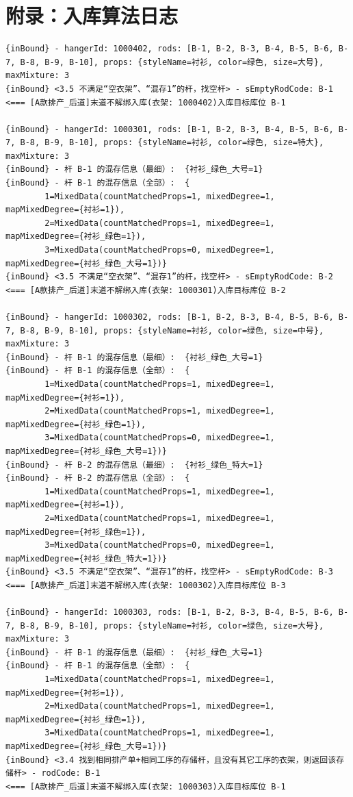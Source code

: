 \section{附录：入库算法日志}\label{sec:inbound-log}
{\scriptsize
\begin{verbatim}
{inBound} - hangerId: 1000402, rods: [B-1, B-2, B-3, B-4, B-5, B-6, B-7, B-8, B-9, B-10], props: {styleName=衬衫, color=绿色, size=大号}, maxMixture: 3
{inBound} <3.5 不满足“空衣架”、“混存1”的杆，找空杆> - sEmptyRodCode: B-1
<=== [A款排产_后道]末道不解绑入库(衣架: 1000402)入库目标库位 B-1

{inBound} - hangerId: 1000301, rods: [B-1, B-2, B-3, B-4, B-5, B-6, B-7, B-8, B-9, B-10], props: {styleName=衬衫, color=绿色, size=特大}, maxMixture: 3
{inBound} - 杆 B-1 的混存信息（最细）:  {衬衫_绿色_大号=1}
{inBound} - 杆 B-1 的混存信息（全部）:  {
		1=MixedData(countMatchedProps=1, mixedDegree=1, mapMixedDegree={衬衫=1}), 
		2=MixedData(countMatchedProps=1, mixedDegree=1, mapMixedDegree={衬衫_绿色=1}), 
		3=MixedData(countMatchedProps=0, mixedDegree=1, mapMixedDegree={衬衫_绿色_大号=1})}
{inBound} <3.5 不满足“空衣架”、“混存1”的杆，找空杆> - sEmptyRodCode: B-2
<=== [A款排产_后道]末道不解绑入库(衣架: 1000301)入库目标库位 B-2

{inBound} - hangerId: 1000302, rods: [B-1, B-2, B-3, B-4, B-5, B-6, B-7, B-8, B-9, B-10], props: {styleName=衬衫, color=绿色, size=中号}, maxMixture: 3
{inBound} - 杆 B-1 的混存信息（最细）:  {衬衫_绿色_大号=1}
{inBound} - 杆 B-1 的混存信息（全部）:  {
		1=MixedData(countMatchedProps=1, mixedDegree=1, mapMixedDegree={衬衫=1}),
		2=MixedData(countMatchedProps=1, mixedDegree=1, mapMixedDegree={衬衫_绿色=1}), 
		3=MixedData(countMatchedProps=0, mixedDegree=1, mapMixedDegree={衬衫_绿色_大号=1})}
{inBound} - 杆 B-2 的混存信息（最细）:  {衬衫_绿色_特大=1}
{inBound} - 杆 B-2 的混存信息（全部）:  {
		1=MixedData(countMatchedProps=1, mixedDegree=1, mapMixedDegree={衬衫=1}), 
		2=MixedData(countMatchedProps=1, mixedDegree=1, mapMixedDegree={衬衫_绿色=1}), 
		3=MixedData(countMatchedProps=0, mixedDegree=1, mapMixedDegree={衬衫_绿色_特大=1})}
{inBound} <3.5 不满足“空衣架”、“混存1”的杆，找空杆> - sEmptyRodCode: B-3
<=== [A款排产_后道]末道不解绑入库(衣架: 1000302)入库目标库位 B-3

{inBound} - hangerId: 1000303, rods: [B-1, B-2, B-3, B-4, B-5, B-6, B-7, B-8, B-9, B-10], props: {styleName=衬衫, color=绿色, size=大号}, maxMixture: 3
{inBound} - 杆 B-1 的混存信息（最细）:  {衬衫_绿色_大号=1}
{inBound} - 杆 B-1 的混存信息（全部）:  {
		1=MixedData(countMatchedProps=1, mixedDegree=1, mapMixedDegree={衬衫=1}), 
		2=MixedData(countMatchedProps=1, mixedDegree=1, mapMixedDegree={衬衫_绿色=1}), 
		3=MixedData(countMatchedProps=1, mixedDegree=1, mapMixedDegree={衬衫_绿色_大号=1})}
{inBound} <3.4 找到相同排产单+相同工序的存储杆，且没有其它工序的衣架，则返回该存储杆> - rodCode: B-1
<=== [A款排产_后道]末道不解绑入库(衣架: 1000303)入库目标库位 B-1


\end{verbatim}}
